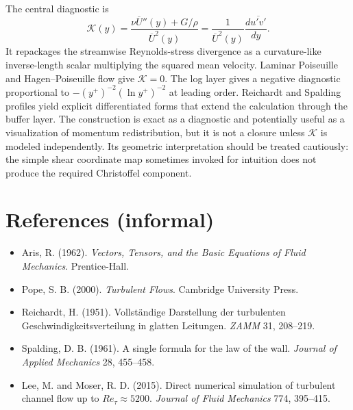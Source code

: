 \documentclass[11pt]{article}
\newcommand{\Ut}{\overline{U}}
\newcommand{\uv}{\overline{u'v'}}
\newcommand{\kapg}{\mathcal{K}}
\begin{document}
The central diagnostic is
\begin{equation*}
\kapg(y)=\frac{\nu\Ut''(y)+G/\rho}{\Ut^2(y)}=\frac{1}{\Ut^2(y)}\frac{d\uv}{dy}.
\end{equation*}
It repackages the streamwise Reynolds-stress divergence as a curvature-like inverse-length scalar multiplying the squared mean velocity. Laminar Poiseuille and Hagen--Poiseuille flow give $\kapg=0$. The log layer gives a negative diagnostic proportional to $-(y^+)^{-2}(\ln y^+)^{-2}$ at leading order. Reichardt and Spalding profiles yield explicit differentiated forms that extend the calculation through the buffer layer. The construction is exact as a diagnostic and potentially useful as a visualization of momentum redistribution, but it is not a closure unless $\kapg$ is modeled independently. Its geometric interpretation should be treated cautiously: the simple shear coordinate map sometimes invoked for intuition does not produce the required Christoffel component.

\section*{References (informal)}
\begin{itemize}
\item Aris, R. (1962). \textit{Vectors, Tensors, and the Basic Equations of Fluid Mechanics}. Prentice-Hall.
\item Pope, S. B. (2000). \textit{Turbulent Flows}. Cambridge University Press.
\item Reichardt, H. (1951). Vollst\"andige Darstellung der turbulenten Geschwindigkeitsverteilung in glatten Leitungen. \textit{ZAMM} 31, 208--219.
\item Spalding, D. B. (1961). A single formula for the law of the wall. \textit{Journal of Applied Mechanics} 28, 455--458.
\item Lee, M. and Moser, R. D. (2015). Direct numerical simulation of turbulent channel flow up to $Re_\tau\approx 5200$. \textit{Journal of Fluid Mechanics} 774, 395--415.
\end{itemize}
\end{document}
